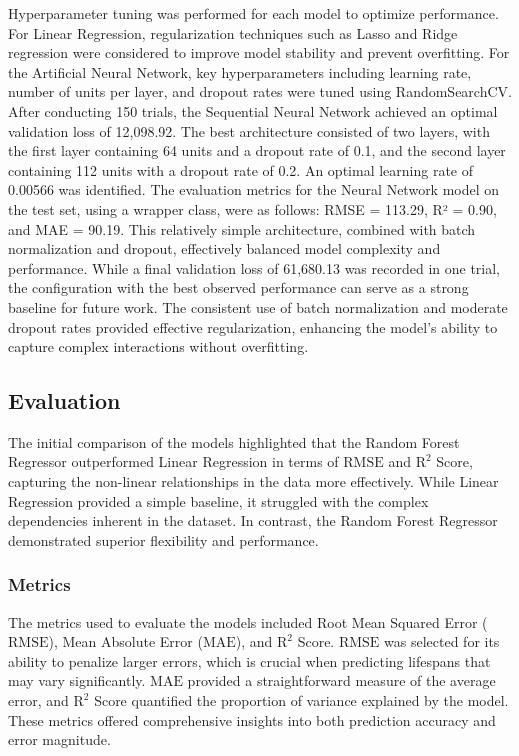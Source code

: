 \documentclass{article}
\begin{document}
Hyperparameter tuning was performed for each model to optimize performance. For Linear Regression, regularization techniques such as Lasso and Ridge regression were considered to improve model stability and prevent overfitting. For the Artificial Neural Network, key hyperparameters including learning rate, number of units per layer, and dropout rates were tuned using RandomSearchCV. After conducting 150 trials, the Sequential Neural Network achieved an optimal validation loss of 12,098.92. The best architecture consisted of two layers, with the first layer containing 64 units and a dropout rate of 0.1, and the second layer containing 112 units with a dropout rate of 0.2. An optimal learning rate of 0.00566 was identified. The evaluation metrics for the Neural Network model on the test set, using a wrapper class, were as follows: RMSE = 113.29, R² = 0.90, and MAE = 90.19. This relatively simple architecture, combined with batch normalization and dropout, effectively balanced model complexity and performance. While a final validation loss of 61,680.13 was recorded in one trial, the configuration with the best observed performance can serve as a strong baseline for future work. The consistent use of batch normalization and moderate dropout rates provided effective regularization, enhancing the model's ability to capture complex interactions without overfitting.

\subsection{Evaluation}

The initial comparison of the models highlighted that the Random Forest Regressor outperformed Linear Regression in terms of $\text{RMSE}$ and $\text{R}^2$ Score, capturing the non-linear relationships in the data more effectively. While Linear Regression provided a simple baseline, it struggled with the complex dependencies inherent in the dataset. In contrast, the Random Forest Regressor demonstrated superior flexibility and performance.

\subsubsection{Metrics}

The metrics used to evaluate the models included Root Mean Squared Error ($\text{RMSE}$), Mean Absolute Error ($\text{MAE}$), and $\text{R}^2$ Score. $\text{RMSE}$ was selected for its ability to penalize larger errors, which is crucial when predicting lifespans that may vary significantly. $\text{MAE}$ provided a straightforward measure of the average error, and $\text{R}^2$ Score quantified the proportion of variance explained by the model. These metrics offered comprehensive insights into both prediction accuracy and error magnitude.
\end{document}

